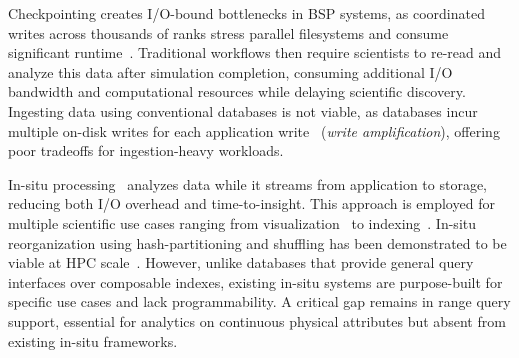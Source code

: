 Checkpointing creates I/O-bound bottlenecks in BSP systems, as coordinated writes across thousands
of ranks stress parallel filesystems and consume significant
runtime~\cite{Xie2012:CharacterizingOutputBottlenecks}.
Traditional workflows then require scientists to re-read and analyze this data after simulation
completion, consuming additional I/O bandwidth and computational resources while delaying
scientific discovery.
Ingesting data using conventional databases is not viable, as databases incur multiple on-disk
writes for each application write~\cite{Raju2017:PebblesDB} (\emph{write amplification}), offering
poor tradeoffs for ingestion-heavy workloads.

In-situ processing~\cite{Child2020:TerminologySituVisualization} analyzes data while it streams
from application to storage, reducing both I/O overhead and time-to-insight.
This approach is employed for multiple scientific use cases ranging from
visualization~\cite{Ayach2015:Catalyst,Ayach2016:SENSEI,Larse2017:ALPINE,Larse2022:Ascent} to
indexing~\cite{Eisen2024:ADIOS,Docan2010:DataSpaces}.
In-situ reorganization using hash-partitioning and shuffling has been demonstrated to be viable at
HPC scale~\cite{Zheng2018:DeltaFS}.
However, unlike databases that provide general query interfaces over composable indexes, existing
in-situ systems are purpose-built for specific use cases and lack programmability.
A critical gap remains in range query support, essential for analytics on continuous physical
attributes but absent from existing in-situ frameworks.




